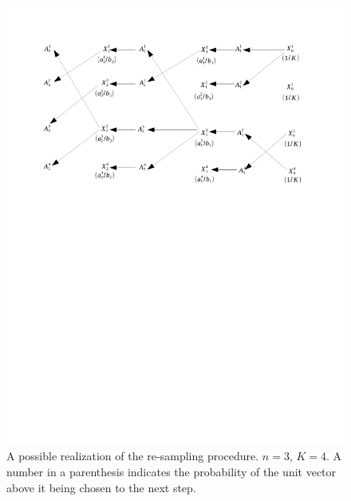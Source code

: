 \begin{figure}[htb!]
  \centering
  \includegraphics[width=0.8\linewidth, trim=2cm 16.5cm 2.5cm 2cm, clip]
  {AnandsEstimator.pdf}
  \caption{A possible realization of the re-sampling procedure. $n =
    3$, $K = 4$. A number in a parenthesis indicates the probability
    of the unit vector above it being chosen to the next step.}
  \label{fig:AnandsEstimator}
\end{figure}

